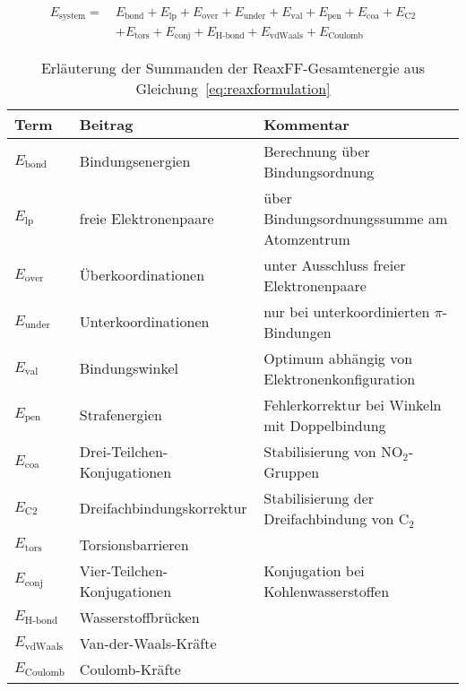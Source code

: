 \begin{align}
  \label{eq:reaxformulation}
  E_\text{system} =~& E_\text{bond} + E_\text{lp} + E_\text{over} + E_\text{under} + E_\text{val} + E_\text{pen} + E_\text{coa} + E_\text{C2} \\
  \nonumber  & + E_\text{tors} + E_\text{conj} + E_\text{H-bond} + E_\text{vdWaals} + E_\text{Coulomb}
\end{align}

\begin{table}
  \oddrowcolors
  \caption[Summanden der ReaxFF-Gesamtenergie]{
    Erläuterung der Summanden der ReaxFF-Gesamtenergie aus Gleichung~\ref{eq:reaxformulation}\cite{van_duin_reaxff:_2001}
  }
  \label{tab:reaxenergies}
  \begin{tabularx}{\textwidth}{|llX|}
    \hline
    \textbf{Term}      & \textbf{Beitrag}            & \textbf{Kommentar}                            \\
    \hline
    $E_\text{bond}$    & Bindungsenergien            & Berechnung über Bindungsordnung               \\
    $E_\text{lp}$      & freie Elektronenpaare       & über Bindungsordnungssumme am Atomzentrum     \\
    $E_\text{over}$    & Überkoordinationen          & unter Ausschluss freier Elektronenpaare       \\
    $E_\text{under}$   & Unterkoordinationen         & nur bei unterkoordinierten $\pi$-Bindungen    \\
    $E_\text{val}$     & Bindungswinkel              & Optimum abhängig von Elektronenkonfiguration  \\
    $E_\text{pen}$     & Strafenergien               & Fehlerkorrektur bei Winkeln mit Doppelbindung \\
    $E_\text{coa}$     & Drei-Teilchen-Konjugationen & Stabilisierung von NO$_2$-Gruppen             \\
    $E_\text{C2}$      & Dreifachbindungskorrektur   & Stabilisierung der Dreifachbindung von C$_2$  \\
    $E_\text{tors}$    & Torsionsbarrieren           &                                               \\
    $E_\text{conj}$    & Vier-Teilchen-Konjugationen & Konjugation bei Kohlenwasserstoffen           \\
    $E_\text{H-bond}$  & Wasserstoffbrücken          &                                               \\
    $E_\text{vdWaals}$ & Van-der-Waals-Kräfte        &                                               \\
    $E_\text{Coulomb}$ & Coulomb-Kräfte              &                                               \\
    \hline
  \end{tabularx}
\end{table}

